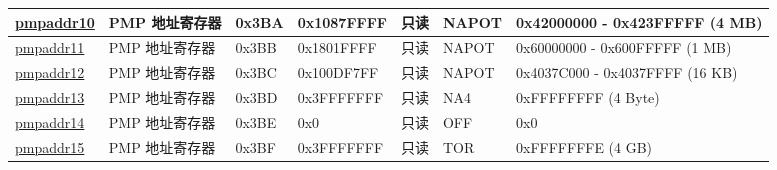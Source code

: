 \begin{longtable}[c]{ | l | l | l | l | l| L{2.2cm}| L{2.23cm}| }
\hyperref[sec:riscvcpu-pmp-reg-desc]{pmpaddr10} & PMP 地址寄存器 & 0x3BA & 0x1087FFFF & 只读 & NAPOT & 0x42000000 - 0x423FFFFF (4 MB)\\\hline
\hyperref[sec:riscvcpu-pmp-reg-desc]{pmpaddr11} & PMP 地址寄存器 & 0x3BB & 0x1801FFFF & 只读 & NAPOT & 0x60000000 - 0x600FFFFF (1 MB)\\\hline
\hyperref[sec:riscvcpu-pmp-reg-desc]{pmpaddr12} & PMP 地址寄存器 & 0x3BC & 0x100DF7FF & 只读 & NAPOT & 0x4037C000 - 0x4037FFFF (16 KB)\\\hline
\hyperref[sec:riscvcpu-pmp-reg-desc]{pmpaddr13} & PMP 地址寄存器 & 0x3BD & 0x3FFFFFFF & 只读 & NA4 & 0xFFFFFFFF (4 Byte)\\\hline
\hyperref[sec:riscvcpu-pmp-reg-desc]{pmpaddr14} & PMP 地址寄存器 & 0x3BE & 0x0 & 只读 & OFF & 0x0 \\\hline
\hyperref[sec:riscvcpu-pmp-reg-desc]{pmpaddr15} & PMP 地址寄存器 & 0x3BF & 0x3FFFFFFF & 只读 & TOR & 0xFFFFFFFE (4 GB)\\\hline

\end{longtable}
